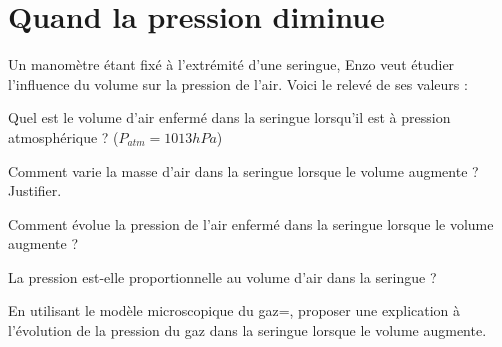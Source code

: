 \section{Quand la pression diminue}

Un manomètre étant fixé à l'extrémité d'une seringue, Enzo veut étudier l'influence du volume sur la pression de l'air. Voici le relevé de ses valeurs :

\begin{center}
\end{center}

\begin{questions}
	\question Quel est le volume d'air enfermé dans la seringue lorsqu'il est à pression atmosphérique ? ($P_{atm}=1013 hPa$)
	
	\fillwithdottedlines{2cm}
	
	\question Comment varie la masse d'air dans la seringue lorsque le volume augmente ? Justifier.
	
	
	\fillwithdottedlines{2cm}
	
	\question Comment évolue la pression de l'air enfermé dans la seringue lorsque le volume augmente ?
	
	\fillwithdottedlines{2cm}
	
	\question La pression est-elle proportionnelle au volume d'air dans la seringue ?
	
	\fillwithdottedlines{2cm}
	
	\question En utilisant le modèle microscopique du gaz=, proposer une explication à l'évolution de la pression du gaz dans la seringue lorsque le volume augmente.
	
	\fillwithdottedlines{3cm}
\end{questions}